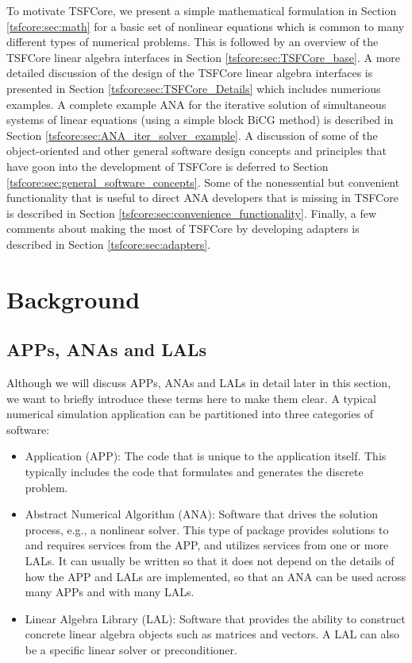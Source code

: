 \documentclass[10pt,fleqn]{article}
\begin{document}
To motivate TSFCore, we present a simple mathematical formulation in
Section \ref{tsfcore:sec:math} for a basic set of nonlinear equations
which is common to many different types of numerical problems.  This
is followed by an overview of the TSFCore linear algebra interfaces in
Section \ref{tsfcore:sec:TSFCore_base}.  A more detailed discussion of
the design of the TSFCore linear algebra interfaces is presented in
Section \ref{tsfcore:sec:TSFCore_Details} which includes numerious
examples.  A complete example ANA for the iterative solution of
simultaneous systems of linear equations (using a simple block BiCG
method) is described in Section
\ref{tsfcore:sec:ANA_iter_solver_example}.  A discussion of some of the
object-oriented and other general software design concepts and
principles that have goon into the development of TSFCore is deferred
to Section \ref{tsfcore:sec:general_software_concepts}.  Some of the
nonessential but convenient functionality that is useful to direct ANA
developers that is missing in TSFCore is described in Section
\ref{tsfcore:sec:convenience_functionality}. Finally, a few comments
about making the most of TSFCore by developing adapters is described in
Section \ref{tsfcore:sec:adapters}.

%
\section{Background}
\label{tsfcore:sec:background}
%

%
\subsection{APPs, ANAs and LALs}
\label{tsfcore:sec:component_overview}
Although we will discuss APPs, ANAs and LALs in detail later in this section, we 
want to briefly introduce these terms here to make them clear.  A typical
numerical simulation application can be partitioned into three categories of software:
\begin{itemize}
\item Application (APP):  The code that is unique to the application itself.  This 
typically includes the code that formulates and generates the discrete problem.
\item Abstract Numerical Algorithm (ANA):  Software that drives the solution process,
e.g., a nonlinear solver.  This type of package provides solutions to and requires services from
the APP, and utilizes services from one or more LALs.  It can usually be written so that
it does not depend on the details of how the APP and LALs are implemented, so that an ANA
can be used across many APPs and with many LALs.
\item Linear Algebra Library (LAL): Software that provides the ability to construct
concrete linear algebra objects such as matrices and vectors.  A LAL can also be a
specific linear solver or preconditioner.
\end{itemize}
\end{document}
